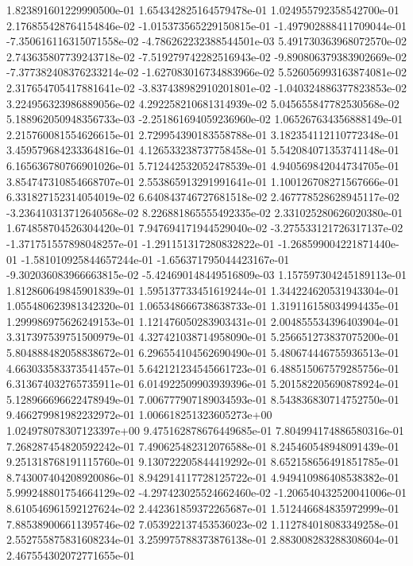 1.823891601229990500e-01
1.654342825164579478e-01
1.024955792358542700e-01
2.176855428764154846e-02
-1.015373565229150815e-01
-1.497902888411709044e-01
-7.350616116315071558e-02
-4.786262232388544501e-03
5.491730363968072570e-02
2.743635807739243718e-02
-7.519279742282516943e-02
-9.890806379383902669e-02
-7.377382408376233214e-02
-1.627083016734883966e-02
5.526056993163874081e-02
2.317654705417881641e-02
-3.837438982910201801e-02
-1.040324886377823853e-02
3.224956323986889056e-02
4.292258210681314939e-02
5.045655847782530568e-02
5.188962050948356733e-03
-2.251861694059236960e-02
1.065267634356888149e-01
2.215760081554626615e-01
2.729954390183558788e-01
3.182354112110772348e-01
3.459579684233364816e-01
4.126533238737758458e-01
5.542084071353741148e-01
6.165636780766901026e-01
5.712442532052478539e-01
4.940569842044734705e-01
3.854747310854668707e-01
2.553865913291991641e-01
1.100126708271567666e-01
6.331827152314054019e-02
6.640843746727681518e-02
2.467778528628945117e-02
-3.236410313712640568e-02
8.226881865555492335e-02
2.331025280626020380e-01
1.674858704526304420e-01
7.947694171944529040e-02
-3.275533121726317137e-02
-1.371751557898048257e-01
-1.291151317280832822e-01
-1.268599004221871440e-01
-1.581010925844657244e-01
-1.656371795044423167e-01
-9.302036083966663815e-02
-5.424690148449516809e-03
1.157597304245189113e-01
1.812860649845901839e-01
1.595137733451619244e-01
1.344224620531943304e-01
1.055480623981342320e-01
1.065348666738638733e-01
1.319116158034994435e-01
1.299986975626249153e-01
1.121476050283903431e-01
2.004855534396403904e-01
3.317397539751500979e-01
4.327421038714958090e-01
5.256651273837075200e-01
5.804888482058838672e-01
6.296554104562690490e-01
5.480674446755936513e-01
4.663033583373541457e-01
5.642121234545661723e-01
6.488515067579285756e-01
6.313674032765735911e-01
6.014922509903939396e-01
5.201582205690878924e-01
5.128966696622478949e-01
7.006777907189034593e-01
8.543836830714752750e-01
9.466279981982232972e-01
1.006618251323605273e+00
1.024978078307123397e+00
9.475162878676449685e-01
7.804994174886580316e-01
7.268287454820592242e-01
7.490625482312076588e-01
8.245460548948091439e-01
9.251318768191115760e-01
9.130722205844419292e-01
8.652158656491851785e-01
8.743007404208920086e-01
8.942914117728125722e-01
4.949410986408538382e-01
5.999248801754664129e-02
-4.297423025524662460e-02
-1.206540432520041006e-01
8.610546961592127624e-02
2.442361859372265687e-01
1.512446684835972999e-01
7.885389006611395746e-02
7.053922137453536023e-02
1.112784018083349258e-01
2.552755875831608234e-01
3.259975788373876138e-01
2.883008283288308604e-01
2.467554302072771655e-01

